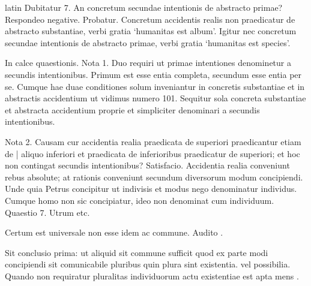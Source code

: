 \begin{otherlanguage*}{latin}
\pstart
  Dubitatur 7. An concretum secundae intentionis de abstracto primae? Respondeo negative. Probatur. Concretum accidentis realis non praedicatur de abstracto substantiae, verbi gratia `humanitas est album'. Igitur nec concretum secundae intentionis de abstracto primae, verbi gratia `humanitas est species'. 
\pend

\pstart
  In calce quaestionis. Nota 1. Duo requiri ut primae intentiones denominetur a secundis intentionibus. Primum est esse entia completa, secundum esse entia per se. Cumque hae duae conditiones solum inveniantur in concretis substantiae et in abstractis accidentium ut vidimus numero 101. Sequitur sola concreta substantiae et abstracta accidentium proprie et simpliciter denominari a secundis intentionibus. 
\pend

\pstart
  Nota 2. Causam cur accidentia realia praedicata de superiori praedicantur etiam de \textnormal{|}    aliquo inferiori et praedicata de inferioribus praedicatur de superiori; et hoc non contingat secundis intentionibus? Satisfacio. Accidentia realia conveniunt rebus absolute; at rationis conveniunt secundum diversorum modum concipiendi. Unde quia Petrus concipitur ut indivisis et modus nego denominatur individus. Cumque homo non sic concipiatur, ideo non denominat cum individuum. Quaestio 7. Utrum etc. 
\pend

        \pstart
        \pend
      
\pstart
  Certum est universale non esse idem ac commune. Audito . 
\pend

\pstart
  Sit conclusio prima: ut aliquid sit commune sufficit quod ex parte modi concipiendi sit comunicabile pluribus quin plura sint existentia. vel possibilia. Quando non requiratur pluralitas individuorum actu existentiae est apta mens  . 
\pend


\end{otherlanguage*}

